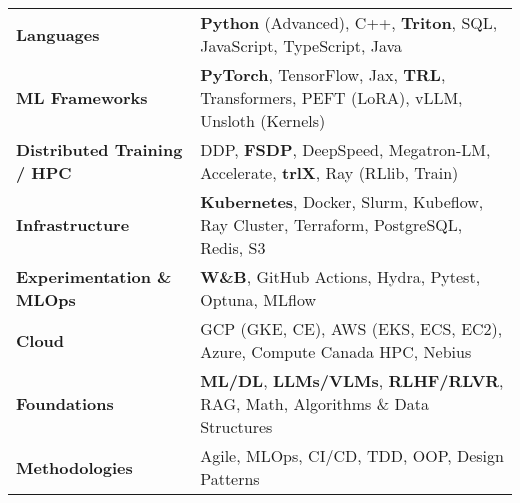 \begin{tabularx}{\textwidth}{@{} >{\bfseries}l L @{}}
Languages &
  \textbf{Python} (Advanced), C++, \textbf{Triton}, SQL, JavaScript, TypeScript, Java \\[2pt]
ML Frameworks &
  \textbf{PyTorch}, TensorFlow, Jax, \textbf{TRL}, Transformers, PEFT (LoRA), vLLM, Unsloth (Kernels) \\
Distributed Training / HPC &
  DDP, \textbf{FSDP}, DeepSpeed, Megatron-LM, Accelerate, \textbf{trlX}, Ray (RLlib, Train) \\[2pt]
Infrastructure &
  \textbf{Kubernetes}, Docker, Slurm, Kubeflow, Ray Cluster, Terraform, PostgreSQL, Redis, S3 \\[2pt]
Experimentation \& MLOps &
  \textbf{W\&B}, GitHub Actions, Hydra, Pytest, Optuna, MLflow \\[2pt]
Cloud &
  GCP (GKE, CE), AWS (EKS, ECS, EC2), Azure, Compute Canada HPC, Nebius \\[2pt]
Foundations &
     \textbf{ML/DL}, \textbf{LLMs/VLMs}, \textbf{RLHF/RLVR}, RAG, Math, Algorithms \& Data Structures \\
Methodologies &
  Agile, MLOps, CI/CD, TDD, OOP, Design Patterns \\[2pt]
\end{tabularx}






